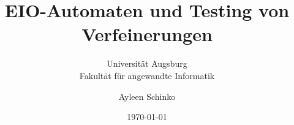 \begin{titlepage}
  \titlehead{\center{}Bachelorarbeit\\
im Studiengang Bachelor Informatik}
\title{EIO-Automaten und Testing von Verfeinerungen}
\date{\today}
\author{Ayleen Schinko}
\subtitle{\vspace{1cm}Universität Augsburg\\
Fakultät für angewandte Informatik}

\maketitle
\end{titlepage}
